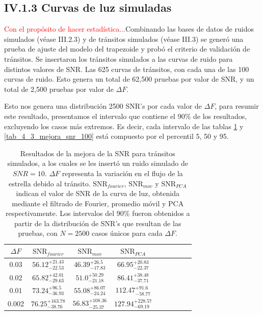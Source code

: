 \subsection*{IV.1.3 Curvas de luz simuladas}

\textcolor{red}{Con el propósito de hacer estadística...}Combinando las bases de datos de ruidos simulados (véase III.2.3) y de tránsitos simulados (véase III.3) se generó una prueba de ajuste del modelo del trapezoide y probó el criterio de validación de tránsitos. Se insertaron los tránsitos simulados a las curvas de ruido para distintos valores de SNR. Las 625 curvas de tránsitos, con cada una de las 100 curvas de ruido. Esto genera un total de 62,500 pruebas por valor de SNR, y un total de 2,500 pruebas por valor de $\Delta F$.

Esto nos genera una distribución 2500 SNR's por cada valor de $\Delta F$, para resumir este resultado, presentamos el intervalo que contiene el 90\% de los resultados, excluyendo los casos más extremos. Es decir, cada intervalo de las tablas \ref{tab_4_2_mejora_snr_10} y \ref{tab_4_3_mejora_snr_100} está compuesto por el percentil 5, 50 y 95.  

\begin{table}
	\centering
	\begin{tabular}{ccccccccc}
	\hline 
	$\Delta F$ & $\mbox{SNR}_{fourier}$ &  $\mbox{SNR}_{mov}$ & $\mbox{SNR}_{PCA}$\\ 
	\hline
	0.03 & 	${56.12}_{-22.53}^{+21.43}$ & ${46.39}_{-17.83}^{+26.5}$ & ${66.95}_{-22.37}^{+20.83}$ \\
	0.02 &  ${65.82}_{-29.63}^{+42.01}$ & ${51.0}_{-21.18}^{+50.29}$ & ${86.41}_{-37.71}^{+38.48}$ \\
	0.01 & ${73.24}_{-36.93}^{+96.5}$ & ${55.08}_{-24.24}^{+86.07}$ & ${112.47}_{-58.77}^{+91.6}$ \\
	0.002 & ${76.25}_{-38.76}^{+163.78}$ & ${56.83}_{-25.37}^{+108.36}$	& ${127.94}_{-69.19}^{+228.57}$ \\
	\hline 
	\end{tabular} 
	\caption{Resultados de la mejora de la SNR para tránsitos simulados, a los cuales se les insertó un ruido simulado de $SNR=10$. $\Delta F$ representa la variación en el flujo de la estrella debido al tránsito. $\mbox{SNR}_{fourier}$, $\mbox{SNR}_{mov}$ y $\mbox{SNR}_{PCA}$ indican el valor de SNR de la curva de luz, obtenida mediante el filtrado de Fourier, promedio móvil y PCA respectivamente. Los intervalos del 90\% fueron obtenidos a partir de la distribución de SNR's que resultan de las pruebas, con $N=2500$ casos únicos para cada $\Delta F$.}
	\label{tab_4_2_mejora_snr_10}
	\end{table}


